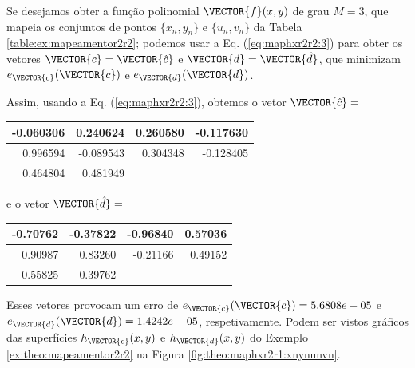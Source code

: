 \begin{minipage}{0.6\textwidth}
\begin{SolutionT}\label{sol:theo:mapeamentor2r2}
Se desejamos obter a função polinomial $\VECTOR{f}(x,y)$ de grau $M=3$,
que mapeia os conjuntos de pontos $\{x_n,y_n\}$ e $\{u_n,v_n\}$ da Tabela \ref{table:ex:mapeamentor2r2}; 
podemos usar a Eq. (\ref{eq:maphxr2r2:3}) 
para obter os vetores $\VECTOR{c}=\VECTOR{\hat{c}}$ e $\VECTOR{d}=\VECTOR{\hat{d}}$,
que minimizam $e_{\VECTOR{c}}(\VECTOR{c})$ e $e_{\VECTOR{d}}(\VECTOR{d})$.


Assim, usando a Eq. (\ref{eq:maphxr2r2:3}), obtemos o vetor $\VECTOR{\hat{c}}=$ 
\begin{center}
\begin{tabular}{ r r r r }
  \hline
  -0.060306 &   0.240624 &   0.260580 &  -0.117630 \\ \hline
   0.996594 &  -0.089543 &   0.304348 &  -0.128405 \\ \hline
   0.464804 &   0.481949 & ~ & ~ \\ \hline
\end{tabular}
\end{center}

e o vetor $\VECTOR{\hat{d}}=$ 
\begin{center}
\begin{tabular}{ r r r r }
\hline
  -0.70762 &  -0.37822 &  -0.96840 &   0.57036 \\ \hline
   0.90987 &   0.83260 &  -0.21166 &   0.49152  \\ \hline
   0.55825 &   0.39762 & ~ & ~ \\ \hline
\end{tabular}
\end{center}
Esses vetores provocam um erro 
de $e_{\VECTOR{c}}(\VECTOR{c})=5.6808e-05$ e $e_{\VECTOR{d}}(\VECTOR{d})=1.4242e-05$, respetivamente.
Podem ser vistos gráficos das superfícies $h_{\VECTOR{c}}(x,y)$ e $h_{\VECTOR{d}}(x,y)$ 
do Exemplo \ref{ex:theo:mapeamentor2r2} na Figura \ref{fig:theo:maphxr2r1:xnynunvn}.
\end{SolutionT}
\end{minipage}

